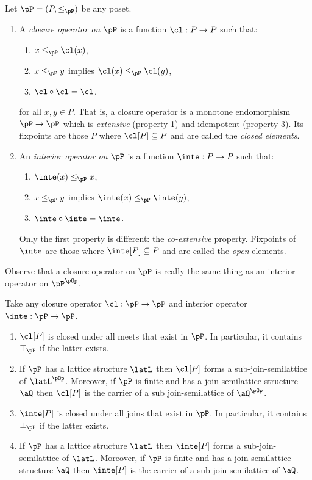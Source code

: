 \documentclass{article}
\begin{document}
\begin{definition}
\label{def:cl_inte}
Let $\pP = (P,\leq_\pP)$ be any poset.
\begin{enumerate}
\item
A \emph{closure operator on $\pP$} is a function $\cl : P \to P$ such that:
\begin{enumerate}
\item
$x \leq_\pP \cl(x)$,
\item
$x \leq_\pP y$ implies $\cl(x) \leq_\pP \cl(y)$,
\item
$\cl \circ \cl = \cl$.
\end{enumerate}
for all $x,y \in P$. That is, a closure operator is a monotone endomorphism $\pP \to \pP$ which is \emph{extensive} (property 1) and idempotent (property 3). Its fixpoints are those $P$ where $\cl[P] \subseteq P$ and are called the \emph{closed elements}.

\item
An \emph{interior operator on $\pP$} is a function $\inte : P \to P$ such that:
\begin{enumerate}
\item
$\inte(x) \leq_\pP x$,
\item
$x \leq_\pP y$ implies $\inte(x) \leq_\pP \inte(y)$,
\item
$\inte \circ \inte = \inte$.
\end{enumerate}
Only the first property is different: the \emph{co-extensive} property. Fixpoints of $\inte$ are those where $\inte[P] \subseteq P$ and are called the \emph{open} elements.
\end{enumerate}
\end{definition}

Observe that a closure operator on $\pP$ is really the same thing as an interior operator on $\pP^{\pOp}$.

\begin{lemma}
\label{lem:clo_co_basic}
\item
Take any closure operator $\cl : \pP \to \pP$ and interior operator $\inte : \pP \to \pP$.
\begin{enumerate}
\item
$\cl[P]$ is closed under all meets that exist in $\pP$. In particular, it contains $\top_\pP$ if the latter exists.
\item
If $\pP$ has a lattice structure $\latL$ then $\cl[P]$ forms a sub-join-semilattice of $\latL^{\pOp}$. Moreover, if $\pP$ is finite and has a join-semilattice structure $\aQ$ then $\cl[P]$ is the carrier of a sub join-semilattice of $\aQ^{\pOp}$.
\item
$\inte[P]$ is closed under all joins that exist in $\pP$. In particular, it contains $\bot_\pP$ if the latter exists.
\item
If $\pP$ has a lattice structure $\latL$ then $\inte[P]$ forms a sub-join-semilattice of $\latL$. Moreover, if $\pP$ is finite and has a join-semilattice structure $\aQ$ then $\inte[P]$ is the carrier of a sub join-semilattice of $\aQ$.
\end{enumerate}
\end{lemma}
\end{document}
